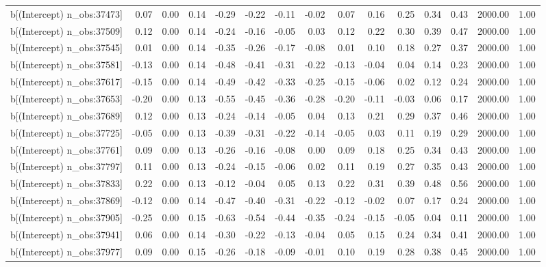 \begin{table}[ht]
\begin{tabular}{rrrrrrrrrrrrrrr}
  b[(Intercept) n\_obs:37473] & 0.07 & 0.00 & 0.14 & -0.29 & -0.22 & -0.11 & -0.02 & 0.07 & 0.16 & 0.25 & 0.34 & 0.43 & 2000.00 & 1.00 \\ 
  b[(Intercept) n\_obs:37509] & 0.12 & 0.00 & 0.14 & -0.24 & -0.16 & -0.05 & 0.03 & 0.12 & 0.22 & 0.30 & 0.39 & 0.47 & 2000.00 & 1.00 \\ 
  b[(Intercept) n\_obs:37545] & 0.01 & 0.00 & 0.14 & -0.35 & -0.26 & -0.17 & -0.08 & 0.01 & 0.10 & 0.18 & 0.27 & 0.37 & 2000.00 & 1.00 \\ 
  b[(Intercept) n\_obs:37581] & -0.13 & 0.00 & 0.14 & -0.48 & -0.41 & -0.31 & -0.22 & -0.13 & -0.04 & 0.04 & 0.14 & 0.23 & 2000.00 & 1.00 \\ 
  b[(Intercept) n\_obs:37617] & -0.15 & 0.00 & 0.14 & -0.49 & -0.42 & -0.33 & -0.25 & -0.15 & -0.06 & 0.02 & 0.12 & 0.24 & 2000.00 & 1.00 \\ 
  b[(Intercept) n\_obs:37653] & -0.20 & 0.00 & 0.13 & -0.55 & -0.45 & -0.36 & -0.28 & -0.20 & -0.11 & -0.03 & 0.06 & 0.17 & 2000.00 & 1.00 \\ 
  b[(Intercept) n\_obs:37689] & 0.12 & 0.00 & 0.13 & -0.24 & -0.14 & -0.05 & 0.04 & 0.13 & 0.21 & 0.29 & 0.37 & 0.46 & 2000.00 & 1.00 \\ 
  b[(Intercept) n\_obs:37725] & -0.05 & 0.00 & 0.13 & -0.39 & -0.31 & -0.22 & -0.14 & -0.05 & 0.03 & 0.11 & 0.19 & 0.29 & 2000.00 & 1.00 \\ 
  b[(Intercept) n\_obs:37761] & 0.09 & 0.00 & 0.13 & -0.26 & -0.16 & -0.08 & 0.00 & 0.09 & 0.18 & 0.25 & 0.34 & 0.43 & 2000.00 & 1.00 \\ 
  b[(Intercept) n\_obs:37797] & 0.11 & 0.00 & 0.13 & -0.24 & -0.15 & -0.06 & 0.02 & 0.11 & 0.19 & 0.27 & 0.35 & 0.43 & 2000.00 & 1.00 \\ 
  b[(Intercept) n\_obs:37833] & 0.22 & 0.00 & 0.13 & -0.12 & -0.04 & 0.05 & 0.13 & 0.22 & 0.31 & 0.39 & 0.48 & 0.56 & 2000.00 & 1.00 \\ 
  b[(Intercept) n\_obs:37869] & -0.12 & 0.00 & 0.14 & -0.47 & -0.40 & -0.31 & -0.22 & -0.12 & -0.02 & 0.07 & 0.17 & 0.24 & 2000.00 & 1.00 \\ 
  b[(Intercept) n\_obs:37905] & -0.25 & 0.00 & 0.15 & -0.63 & -0.54 & -0.44 & -0.35 & -0.24 & -0.15 & -0.05 & 0.04 & 0.11 & 2000.00 & 1.00 \\ 
  b[(Intercept) n\_obs:37941] & 0.06 & 0.00 & 0.14 & -0.30 & -0.22 & -0.13 & -0.04 & 0.05 & 0.15 & 0.24 & 0.34 & 0.41 & 2000.00 & 1.00 \\ 
  b[(Intercept) n\_obs:37977] & 0.09 & 0.00 & 0.15 & -0.26 & -0.18 & -0.09 & -0.01 & 0.10 & 0.19 & 0.28 & 0.38 & 0.45 & 2000.00 & 1.00 \\ 

\end{tabular}
\end{table}
